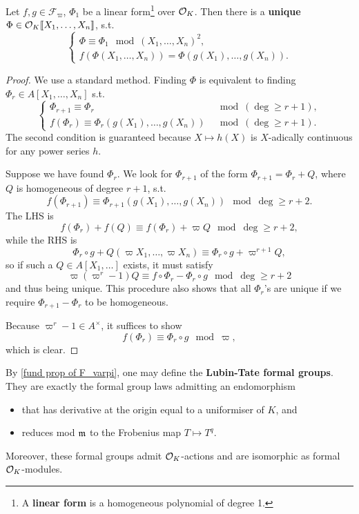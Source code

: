 \begin{lemma}\label{fund prop of F_varpi}
    Let $f, g\in\mathcal{F}_\varpi$, $\Phi_1$ be a linear form\footnote{A \textbf{linear form} is a homogeneous polynomial of degree 1.} over $\mathcal{O}_K$. Then there is a \textbf{unique} $\Phi\in\mathcal{O}_K\llbracket X_1,\dots, X_n \rrbracket$, s.t.\[\begin{cases}
        \Phi \equiv \Phi_1 \mod (X_1, \dots, X_n)^2,\\
        f(\Phi(X_1, \dots, X_n)) = \Phi(g(X_1), \dots, g(X_n)).
    \end{cases}\]
\end{lemma}
\begin{proof}
    We use a standard method. Finding $\Phi$ is equivalent to finding $\Phi_r\in A[X_1, \dots, X_n]$ s.t. \[\begin{cases}
        \Phi_{r+1} \equiv \Phi_r &\mod (\deg\ge r+1),\\
        f(\Phi_r)\equiv \Phi_r(g(X_1), \dots, g(X_n)) &\mod(\deg\ge r+1). 
    \end{cases}\]
    The second condition is guaranteed because $X\mapsto h(X)$ is $X$-adically continuous for any power series $h$.

    Suppose we have found $\Phi_r$. We look for $\Phi_{r+1}$ of the form $\Phi_{r+1} = \Phi_r + Q$, where $Q$ is homogeneous of degree $r+1$, s.t. \[f(\Phi_{r+1}) \equiv \Phi_{r+1}(g(X_1), \dots, g(X_n)) \mod \deg\ge r+2.\]
    The LHS is
    \[f(\Phi_r) + f(Q)\equiv f(\Phi_r) + \varpi Q\mod\deg\ge r+2,\]
    while the RHS is
    \[\Phi_r\circ g + Q(\varpi X_1, \dots, \varpi X_n)\equiv \Phi_r\circ g + \varpi^{r+1}Q,\]
    so if such a $Q\in A[X_1, \dots]$ exists, it must satisfy 
    \[\varpi(\varpi^r - 1)Q\equiv f\circ \Phi_r - \Phi_r\circ g\mod\deg\ge r+2\]
    and thus being unique.
    This procedure also shows that all $\Phi_r$'s are unique if we require $\Phi_{r+1} - \Phi_r$ to be homogeneous.

    Because $\varpi^r - 1\in A^\times$, it suffices to show \[f(\Phi_r) \equiv \Phi_r\circ g\mod \varpi,\] which is clear.
\end{proof}

By \cref{fund prop of F_varpi}, one may define the \textbf{Lubin-Tate formal groups}.
They are exactly the formal group laws admitting an endomorphism\begin{itemize}
    \item that has derivative at the origin equal to a uniformiser of $K$, and
    \item reduces mod $\mathfrak{m}$ to the Frobenius map $T\mapsto T^q$.
\end{itemize}
Moreover, these formal groups admit $\mathcal{O}_K$-actions and are isomorphic as formal $\mathcal{O}_K$-modules.

